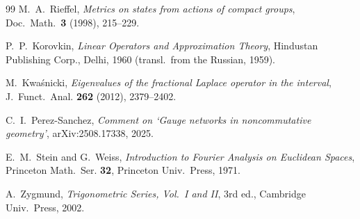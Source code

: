 \documentclass[11pt,a4paper]{article}
\theoremstyle{plain}
\theoremstyle{definition}
\begin{document}
\begin{thebibliography}{99}
M.~A.~Rieffel, \emph{Metrics on states from actions of compact groups},
Doc.\ Math.\ \textbf{3} (1998), 215--229.

P.~P.~Korovkin,
\newblock \emph{Linear Operators and Approximation Theory},
\newblock Hindustan Publishing Corp., Delhi, 1960 (transl.\ from the Russian, 1959).

M.~Kwa\'snicki,
\newblock \emph{Eigenvalues of the fractional Laplace operator in the interval},
\newblock J.~Funct.~Anal. \textbf{262} (2012), 2379--2402.

C.~I.~Perez-Sanchez,
\newblock \emph{Comment on `Gauge networks in noncommutative
geometry'},
\newblock arXiv:2508.17338, 2025.

E.~M.~Stein and G.~Weiss,
\newblock \emph{Introduction to Fourier Analysis on Euclidean Spaces},
\newblock Princeton Math.~Ser. \textbf{32}, Princeton Univ.~Press, 1971.

A.~Zygmund,
\newblock \emph{Trigonometric Series, Vol.~I and II},
\newblock 3rd ed., Cambridge Univ.~Press, 2002.

\end{thebibliography}
\end{document}
